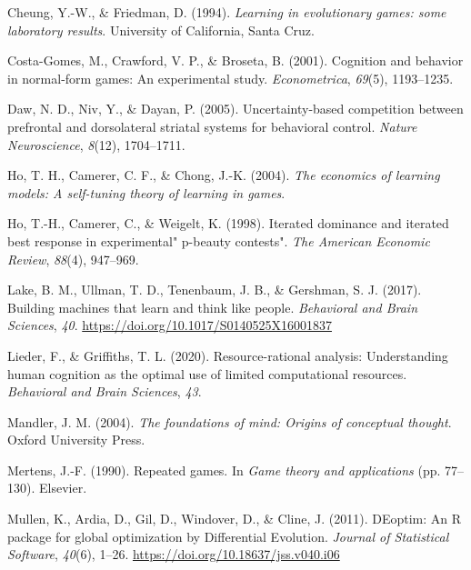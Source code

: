 \documentclass[english,man,floatsintext]{apa6}
\begin{document}
\leavevmode\hypertarget{ref-cheung1994learning}{}%
Cheung, Y.-W., \& Friedman, D. (1994). \emph{Learning in evolutionary games: some laboratory results}. University of California, Santa Cruz.

\leavevmode\hypertarget{ref-costa2001cognition}{}%
Costa-Gomes, M., Crawford, V. P., \& Broseta, B. (2001). Cognition and behavior in normal-form games: An experimental study. \emph{Econometrica}, \emph{69}(5), 1193--1235.

\leavevmode\hypertarget{ref-daw2005uncertainty}{}%
Daw, N. D., Niv, Y., \& Dayan, P. (2005). Uncertainty-based competition between prefrontal and dorsolateral striatal systems for behavioral control. \emph{Nature Neuroscience}, \emph{8}(12), 1704--1711.

\leavevmode\hypertarget{ref-ho2004economics}{}%
Ho, T. H., Camerer, C. F., \& Chong, J.-K. (2004). \emph{The economics of learning models: A self-tuning theory of learning in games}.

\leavevmode\hypertarget{ref-ho1998iterated}{}%
Ho, T.-H., Camerer, C., \& Weigelt, K. (1998). Iterated dominance and iterated best response in experimental" p-beauty contests". \emph{The American Economic Review}, \emph{88}(4), 947--969.

\leavevmode\hypertarget{ref-Lake2017}{}%
Lake, B. M., Ullman, T. D., Tenenbaum, J. B., \& Gershman, S. J. (2017). Building machines that learn and think like people. \emph{Behavioral and Brain Sciences}, \emph{40}. \url{https://doi.org/10.1017/S0140525X16001837}

\leavevmode\hypertarget{ref-lieder2020resource}{}%
Lieder, F., \& Griffiths, T. L. (2020). Resource-rational analysis: Understanding human cognition as the optimal use of limited computational resources. \emph{Behavioral and Brain Sciences}, \emph{43}.

\leavevmode\hypertarget{ref-mandler2004foundations}{}%
Mandler, J. M. (2004). \emph{The foundations of mind: Origins of conceptual thought}. Oxford University Press.

\leavevmode\hypertarget{ref-mertens1990repeated}{}%
Mertens, J.-F. (1990). Repeated games. In \emph{Game theory and applications} (pp. 77--130). Elsevier.

\leavevmode\hypertarget{ref-R-DEoptim}{}%
Mullen, K., Ardia, D., Gil, D., Windover, D., \& Cline, J. (2011). DEoptim: An R package for global optimization by Differential Evolution. \emph{Journal of Statistical Software}, \emph{40}(6), 1--26. \url{https://doi.org/10.18637/jss.v040.i06}
\end{document}
